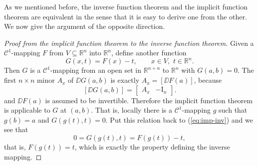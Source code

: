 \documentclass[11pt]{article}
\begin{document}
As we mentioned before, the inverse function theorem and the implicit function theorem are equivalent in the sense that it is easy to derive one from the other.
We now give the argument of the opposite direction.

\begin{proof}[Proof from the implicit function theorem to the inverse function theorem]
  Given a $\mathcal{C}^1$-mapping $F$ from $V\subseteq\mathbb{R}^n$ into $\mathbb{R}^n$, define another function
  \begin{equation}
    \label{eq:imp-inv}
    G(x,t) = F(x) - t, \qquad x \in V, \,\, t \in \mathbb{R}^n.
  \end{equation}
  Then $G$ is a $\mathcal{C}^1$-mapping from an open set in $\mathbb{R}^{n+n}$ to $\mathbb{R}^n$ with $G(a,b) = 0$.
  The first $n \times n$ minor $A_x$ of $\DD G(a,b)$ is exactly $A_x = [\DD F(a)]$, because
  \[
    [ \DD G(a,b) ] = \begin{bmatrix} A_x & - {\mathrm I}_n \end{bmatrix}.
  \]
  and $\DD F(a)$ is assumed to be invertible.
  Therefore the implicit function theorem is applicable to $G$ at $(a,b)$.
  That is, locally there is a $\mathcal{C}^1$-mapping $g$ such that $g(b) = a$ and $G\left( g(t), t \right) = 0$.
  Put this relation back to (\ref{eq:imp-inv}) and we see that
  \[
    0 = G\left( g(t), t \right) = F\left( g(t) \right) - t,
  \]
  that is, $F\left( g(t) \right) = t$, which is exactly the property defining the inverse mapping.
\end{proof}
\end{document}
